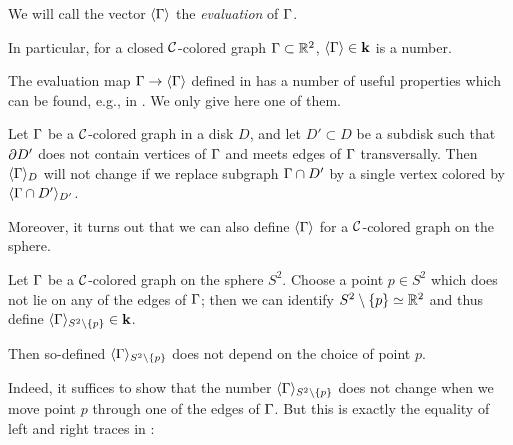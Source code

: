 \begin{theorem}
%
%
We will call the vector $\langle\Gamma\rangle$ the {\em evaluation} of $\Gamma$.
\end{theorem}

In particular, for a closed $\mathcal{C}$-colored graph $\Gamma\subset \mathbb{R}^2$,
$\langle\Gamma\rangle\in \mathbf{k}$ is a number.

The evaluation map $\Gamma\to\langle\Gamma\rangle$ defined in  has a
number of useful properties which can be found, e.g., in
\cite{kirillov-stringnet}. We only give here one of them.

\begin{lemma}\label{l:eval-subdisk}
  Let $\Gamma$ be a $\mathcal{C}$-colored graph in a disk $D$, and let $D'\subset D$ be
  a subdisk such that $\partial D'$ does not contain vertices of $\Gamma$ and meets
  edges of $\Gamma$ transversally. Then $\langle\Gamma\rangle_D$ will not change if we replace
  subgraph $\Gamma\cap D'$ by a single vertex colored by $\langle\Gamma\cap D'\rangle_{D'}$.
\end{lemma}

Moreover, it turns out that we can also define $\langle\Gamma\rangle$ for a $\mathcal{C}$-colored
graph on the sphere.

\begin{lemma}\label{l:colored-spherical}
  Let $\Gamma$ be a $\mathcal{C}$-colored graph on the sphere $S^2$. Choose a point $p\in
  S^2$ which does not lie on any of the edges of $\Gamma$; then we can
  identify $S^2\setminus\{p\}\simeq \mathbb{R}^2$ and thus define
  $\langle\Gamma\rangle_{S^2\setminus\{p\}}\in \mathbf{k}$.

  Then so-defined $\langle\Gamma\rangle_{S^2\setminus\{p\}}$ does not depend on the choice
  of point
  $p$.
\end{lemma}
Indeed, it suffices to show that the number $\langle\Gamma\rangle_{S^2\setminus\{p\}}$ does
not
change when we move point $p$ through one of the edges of $\Gamma$. But this is
exactly the equality of left and right traces in :


